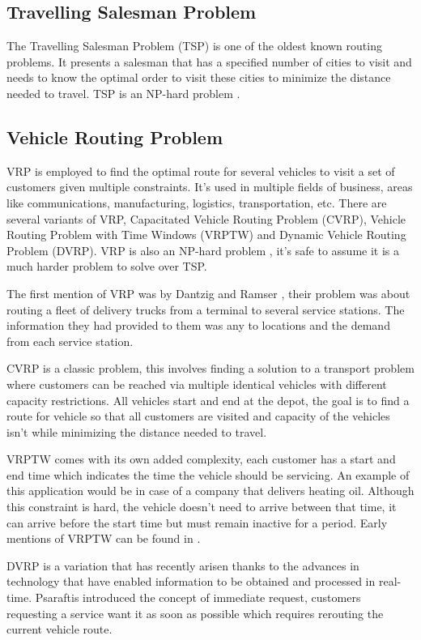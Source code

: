 \documentclass[a4paper,11pt]{article}
\begin{document}
\subsection{Travelling Salesman Problem}
The Travelling Salesman Problem (TSP) is one of the oldest known routing problems. It presents a salesman that has a specified number of cities to visit and needs to know the optimal order to visit these cities to minimize the distance needed to travel. TSP is an NP-hard problem \cite{lenstra1981complexity}.

\subsection{Vehicle Routing Problem}
VRP is employed to find the optimal route for several vehicles to visit a set of customers given multiple constraints. It's used in multiple fields of business, areas like communications, manufacturing, logistics, transportation, etc. There are several variants of VRP, Capacitated Vehicle Routing Problem (CVRP), Vehicle Routing Problem with Time Windows (VRPTW) and Dynamic Vehicle Routing Problem (DVRP). VRP is also an NP-hard problem \cite{lenstra1981complexity} , it's safe to assume it is a much harder problem to solve over TSP.

The first mention of VRP was by Dantzig and Ramser  \cite{dantzig1959truck}, their problem was about routing a fleet of delivery trucks from a terminal to several service stations. The information they had provided to them was any to locations and the demand from each service station. 

CVRP is a classic problem, this involves finding a solution to a transport problem where customers can be reached via multiple identical vehicles with different capacity restrictions. All vehicles start and end at the depot, the goal is to find a route for vehicle so that all customers are visited and capacity of the vehicles isn't while minimizing the distance needed to travel. 
 
VRPTW comes with its own added complexity, each customer has a start and end time which indicates the time the vehicle should be servicing. An example of this application would be in case of a company that delivers heating oil. Although this constraint is hard, the vehicle doesn't need to arrive between that time, it can arrive before the start time but must remain inactive for a period. Early mentions of VRPTW can be found in \cite{teodorovic2000fuzzy}.

DVRP is a variation that has recently arisen thanks to the advances in technology that have enabled information to be obtained and processed in real-time. Psaraftis \cite{psaraftis1980dynamic} introduced the concept of immediate request, customers requesting a service want it as soon as possible which requires rerouting the current vehicle route. 
\end{document}
